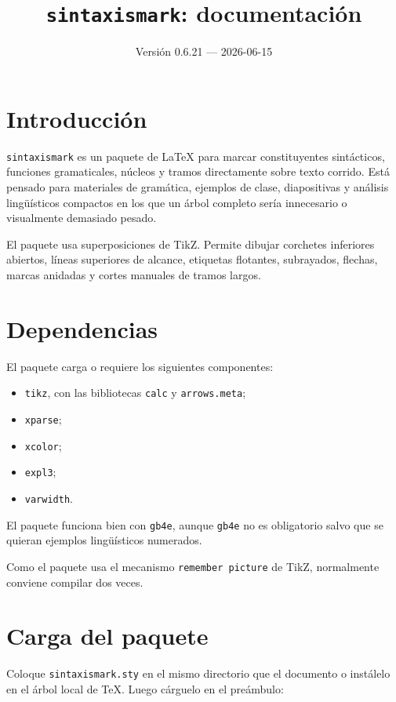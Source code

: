 \documentclass[11pt,a4paper]{article}
\title{\texttt{sintaxismark}: documentación}
\author{}
\date{Versión 0.6.21 --- 2026-06-15}
\begin{document}
\maketitle
\tableofcontents

\section{Introducción}

\texttt{sintaxismark} es un paquete de LaTeX para marcar constituyentes sintácticos, funciones gramaticales, núcleos y tramos directamente sobre texto corrido. Está pensado para materiales de gramática, ejemplos de clase, diapositivas y análisis lingüísticos compactos en los que un árbol completo sería innecesario o visualmente demasiado pesado.

El paquete usa superposiciones de TikZ. Permite dibujar corchetes inferiores abiertos, líneas superiores de alcance, etiquetas flotantes, subrayados, flechas, marcas anidadas y cortes manuales de tramos largos.

\section{Dependencias}

El paquete carga o requiere los siguientes componentes:

\begin{itemize}
  \item \texttt{tikz}, con las bibliotecas \texttt{calc} y \texttt{arrows.meta};
  \item \texttt{xparse};
  \item \texttt{xcolor};
  \item \texttt{expl3};
  \item \texttt{varwidth}.
\end{itemize}

El paquete funciona bien con \texttt{gb4e}, aunque \texttt{gb4e} no es obligatorio salvo que se quieran ejemplos lingüísticos numerados.

Como el paquete usa el mecanismo \texttt{remember picture} de TikZ, normalmente conviene compilar dos veces.

\section{Carga del paquete}

Coloque \texttt{sintaxismark.sty} en el mismo directorio que el documento o instálelo en el árbol local de TeX. Luego cárguelo en el preámbulo:
\end{document}
